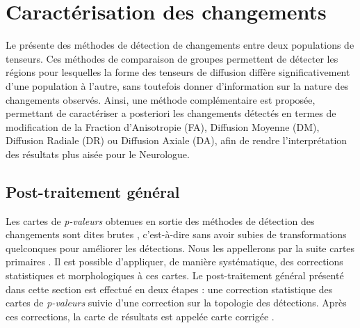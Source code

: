 
\chapter{Caractérisation des changements}
\label{Chapter6}

Le  présente des méthodes de détection de changements entre deux populations de tenseurs.
Ces méthodes de comparaison de groupes permettent de détecter les régions pour lesquelles la forme des tenseurs de diffusion diffère 
significativement d'une population à l'autre, sans toutefois donner d'information sur la nature des changements observés.
Ainsi, une méthode complémentaire est proposée, permettant de caractériser a posteriori les changements détectés en termes de
modification de la Fraction d'Anisotropie (FA), Diffusion Moyenne (DM), Diffusion Radiale (DR) ou Diffusion
Axiale (DA), afin de rendre l'interprétation des résultats plus aisée pour le Neurologue.\\



\section{Post-traitement général}
Les cartes de \textit{p-valeurs} obtenues en sortie des méthodes de détection des changements sont dites \og brutes \fg,
c'est-à-dire sans avoir subies de transformations quelconques pour améliorer les détections.
Nous les appellerons par la suite \og cartes primaires \fg.
Il est possible d'appliquer, de manière systématique, des corrections statistiques et morphologiques à ces cartes.
Le post-traitement général présenté dans cette section est effectué en deux étapes : 
une correction statistique des cartes de \textit{p-valeurs} suivie d'une correction sur la topologie des détections.
Après ces corrections, la carte de résultats est appelée \og carte corrigée \fg.

